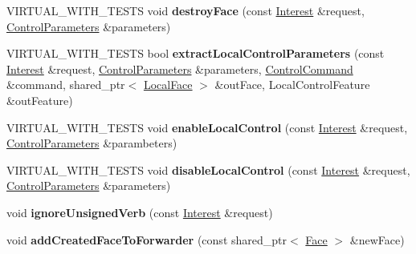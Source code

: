 \begin{DoxyCompactItemize}
\item 
V\+I\+R\+T\+U\+A\+L\+\_\+\+W\+I\+T\+H\+\_\+\+T\+E\+S\+TS void {\bfseries destroy\+Face} (const \hyperlink{classndn_1_1Interest}{Interest} \&request, \hyperlink{classndn_1_1nfd_1_1ControlParameters}{Control\+Parameters} \&parameters)\hypertarget{classnfd_1_1FaceManager_a27c33f456d72388631d645c750ab4a81}{}\label{classnfd_1_1FaceManager_a27c33f456d72388631d645c750ab4a81}

\item 
V\+I\+R\+T\+U\+A\+L\+\_\+\+W\+I\+T\+H\+\_\+\+T\+E\+S\+TS bool {\bfseries extract\+Local\+Control\+Parameters} (const \hyperlink{classndn_1_1Interest}{Interest} \&request, \hyperlink{classndn_1_1nfd_1_1ControlParameters}{Control\+Parameters} \&parameters, \hyperlink{classndn_1_1nfd_1_1ControlCommand}{Control\+Command} \&command, shared\+\_\+ptr$<$ \hyperlink{classnfd_1_1LocalFace}{Local\+Face} $>$ \&out\+Face, Local\+Control\+Feature \&out\+Feature)\hypertarget{classnfd_1_1FaceManager_ac581d61d9f2f6bd52eaa1dd07ae09cc0}{}\label{classnfd_1_1FaceManager_ac581d61d9f2f6bd52eaa1dd07ae09cc0}

\item 
V\+I\+R\+T\+U\+A\+L\+\_\+\+W\+I\+T\+H\+\_\+\+T\+E\+S\+TS void {\bfseries enable\+Local\+Control} (const \hyperlink{classndn_1_1Interest}{Interest} \&request, \hyperlink{classndn_1_1nfd_1_1ControlParameters}{Control\+Parameters} \&parambeters)\hypertarget{classnfd_1_1FaceManager_ab9cd16b32b1d3eaeda9f71003adb0e4f}{}\label{classnfd_1_1FaceManager_ab9cd16b32b1d3eaeda9f71003adb0e4f}

\item 
V\+I\+R\+T\+U\+A\+L\+\_\+\+W\+I\+T\+H\+\_\+\+T\+E\+S\+TS void {\bfseries disable\+Local\+Control} (const \hyperlink{classndn_1_1Interest}{Interest} \&request, \hyperlink{classndn_1_1nfd_1_1ControlParameters}{Control\+Parameters} \&parameters)\hypertarget{classnfd_1_1FaceManager_a888a4927901317e1369e8b335283cb53}{}\label{classnfd_1_1FaceManager_a888a4927901317e1369e8b335283cb53}

\item 
void {\bfseries ignore\+Unsigned\+Verb} (const \hyperlink{classndn_1_1Interest}{Interest} \&request)\hypertarget{classnfd_1_1FaceManager_aae30384a3f03669166b90760141bbf8f}{}\label{classnfd_1_1FaceManager_aae30384a3f03669166b90760141bbf8f}

\item 
void {\bfseries add\+Created\+Face\+To\+Forwarder} (const shared\+\_\+ptr$<$ \hyperlink{classnfd_1_1Face}{Face} $>$ \&new\+Face)\hypertarget{classnfd_1_1FaceManager_ade231df42d0a84abe383f8cf21402124}{}\label{classnfd_1_1FaceManager_ade231df42d0a84abe383f8cf21402124}


\end{DoxyCompactItemize}
